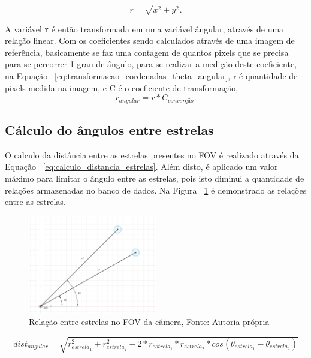 \begin{equation}
	r = \sqrt{x^2 + y^2}.
	\label{eq:transformacao_cordenadas_r}
\end{equation}

A variável \textbf{r} é então transformada em uma variável ângular, através de uma relação linear. 
Com os coeficientes sendo calculados através de uma imagem de referência, 
basicamente se faz uma contagem de quantos pixels que se precisa para se percorrer 1 grau de ângulo, para se realizar a medição deste coeficiente,
na Equação ~\ref{eq:transformacao_cordenadas_theta_angular}, r é quantidade de pixels medida na imagem, e C é o coeficiente de transformação, 
\begin{equation}
	r_{angular} = r * C_{converção}.
	\label{eq:transformacao_cordenadas_theta_angular}
\end{equation}

\subsection{Cálculo do ângulos entre estrelas}

O calculo da distância entre as estrelas presentes no FOV é realizado através da Equação ~\ref{eq:calculo_distancia_estrelas}.
Além disto, é aplicado um valor máximo para limitar o ângulo entre as estrelas, pois isto diminui a quantidade de relações armazenadas no banco de dados.
Na Figura ~\ref{fig:angulo_entre_estrelas} é demonstrado as relações entre as estrelas.

\begin{figure}[H]
	\centering
	\includegraphics[width=0.5\textwidth]{images/relacoes_entre_estrelas.png}
	\caption{Relação entre estrelas no FOV da câmera, Fonte: Autoria própria}
	\label{fig:angulo_entre_estrelas}
\end{figure}

\begin{equation}
	dist_{angular} = \sqrt{r_{estrela_1}^2 + r_{estrela_2}^2 - 2 * r_{estrela_1} * r_{estrela_2} * cos(\theta_{estrela_1} - \theta_{estrela_2})}
	\label{eq:calculo_distancia_estrelas}
\end{equation}

